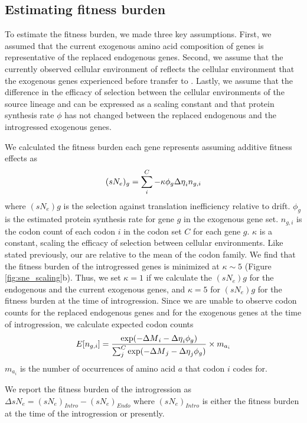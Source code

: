\documentclass[12pt]{article}
\begin{document}
\subsection*{Estimating fitness burden}

To estimate the fitness burden, we made three key assumptions.
First, we assumed that the current exogenous amino acid composition of genes is representative of the replaced endogenous genes.
Second, we assume that the currently observed cellular environment of \gossypii reflects the cellular environment that the exogenous genes experienced before transfer to \kluyveri.
Lastly, we assume that the difference in the efficacy of selection between the cellular environments of the source lineage and \kluyveri can be expressed as a scaling constant and that protein synthesis rate $\phi$ has not changed between the replaced endogenous and the introgressed exogenous genes.

We calculated the fitness burden each gene represents assuming additive fitness effects as 
\begin{equation}
(sN_e)_g = \sum_i^{C} -\kappa \phi_g {\Delta \eta}_i n_{g,i} 
\end{equation}
where $(sN_e)g$ is the selection against translation inefficiency relative to drift.
$\phi_g$ is the estimated protein synthesis rate for gene $g$ in the exogenous gene set.
$n_{g,i}$ is the codon count of each codon $i$ in the codon set $C$ for each gene $g$.
$\kappa$ is a constant, scaling the efficacy of selection between cellular environments.
Like stated previously, our \DE are relative to the mean of the codon family.
We find that the fitness burden of the introgressed genes  is minimized at $\kappa \sim 5$ (Figure \ref{fig:sne_scaling}b).
Thus, we set $\kappa = 1$ if we calculate the $(sN_e)g$ for the endogenous and the current exogenous genes, and $\kappa = 5$ for $(sN_e)g$ for the fitness burden at the time of introgression.
Since we are unable to observe codon counts for the replaced endogenous genes and for the exogenous genes at the time of introgression, we calculate expected codon counts
\begin{equation}
E[n_{g,i}] = \frac{\exp(-{\Delta M}_i -{\Delta \eta}_i\phi_g)}{\sum_j^C \exp(-{\Delta M}_j -{\Delta \eta}_j\phi_g)}\times m_{a_i}
\end{equation} 
$m_{a_i}$ is the number of occurrences of amino acid $a$ that codon $i$ codes for.

We report the fitness burden of the introgression as $\Delta sN_e = (sN_e)_{Intro} - (sN_e)_{Endo}$ where $(sN_e)_{Intro}$ is either the fitness burden at the time of the introgression or presently.
\end{document}
